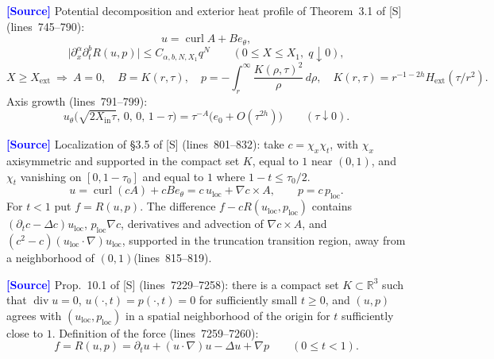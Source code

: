 \documentclass[11pt,a4paper]{article}
\theoremstyle{definition}
\theoremstyle{remark}
\newcommand{\R}{\mathbb{R}}
\newcommand{\lnos}[1]{(lines~#1)}
\newcommand{\ORIG}{\textcolor{blue}{\textbf{[Source]}}}
\begin{document}
\ORIG
Potential decomposition and exterior heat profile of Theorem~3.1 of [S] \lnos{745--790}:
\begin{equation}
\label{eq:33}
u=\operatorname{curl} A+B e_\theta,
\end{equation}
\begin{equation}
\label{eq:34}
\bigl|\partial_x^\alpha\partial_t^b R(u,p)\bigr|
\le C_{\alpha,b,N,X_1} q^N
\qquad(0\le X\le X_1,\;q\downarrow 0),
\end{equation}
\begin{equation}
\label{eq:35}
X\ge X_{\mathrm{ext}}\ \Rightarrow\
A=0,\quad
B=K(r,\tau),\quad
p=-\int_r^\infty\frac{K(\rho,\tau)^2}{\rho}\,d\rho,\quad
K(r,\tau)=r^{-1-2h}H_{\mathrm{ext}}(\tau/r^2).
\end{equation}
Axis growth \lnos{791--799}:
\begin{equation}
\label{eq:36}
u_\theta\bigl(\sqrt{2X_{\mathrm{in}}\tau},\,0,\,0,\,1-\tau\bigr)
=\tau^{-A}\bigl(e_0+O(\tau^{2h})\bigr)\qquad(\tau\downarrow 0).
\end{equation}

\ORIG
Localization of \S3.5 of [S] \lnos{801--832}: take $c=\chi_x\chi_t$,
with $\chi_x$ axisymmetric and supported in the compact set $K$, equal to $1$ near $(0,1)$,
and $\chi_t$ vanishing on $[0,1-\tau_0]$ and equal to $1$ where $1-t\le\tau_0/2$.
\begin{equation}
\label{eq:loc}
u=\operatorname{curl}(cA)+c B e_\theta
=c\,u_{\mathrm{loc}}+\nabla c\times A,\qquad
p=c\,p_{\mathrm{loc}}.
\end{equation}
For $t<1$ put $f=R(u,p)$. The difference $f-c R(u_{\mathrm{loc}},p_{\mathrm{loc}})$ contains
$(\partial_t c-\Delta c)u_{\mathrm{loc}}$, $p_{\mathrm{loc}}\nabla c$,
derivatives and advection of $\nabla c\times A$, and $(c^2-c)(u_{\mathrm{loc}}\cdot\nabla)u_{\mathrm{loc}}$,
supported in the truncation transition region, away from a neighborhood of $(0,1)$\lnos{815--819}.

\ORIG
Prop.~10.1 of [S] \lnos{7229--7258}: there is a compact set $K\subset\R^3$ such that
$\operatorname{div} u=0$, $u(\cdot,t)=p(\cdot,t)=0$ for sufficiently small $t\ge 0$, and
$(u,p)$ agrees with $(u_{\mathrm{loc}},p_{\mathrm{loc}})$ in a spatial neighborhood of the origin for $t$
sufficiently close to $1$. Definition of the force \lnos{7259--7260}:
\begin{equation}
\label{eq:105}
f=R(u,p)=\partial_t u+(u\cdot\nabla)u-\Delta u+\nabla p\qquad(0\le t<1).
\end{equation}
\end{document}
